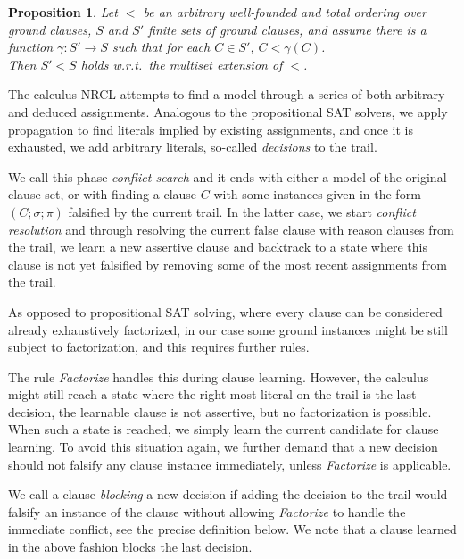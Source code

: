 \documentclass[a4paper]{article}
\newcommand{\leaveabit}{\\[6 pt]}
\newtheorem{prop}[defi]{Proposition}
\begin{document}
\begin{prop}\label{orderPropProp}
Let $<$ be \emph{an arbitrary well-founded and total ordering over ground clauses}, 
$S$ and $S'$ finite sets of ground clauses, and assume there is a function
$\gamma: S' \rightarrow S$ such that for each $C \in S'$, $C < \gamma(C)$.
\leaveabit
Then $S' < S$ holds w.r.t.\
the multiset extension of $<$.
\end{prop}

The calculus NRCL attempts to find a model through a series of both arbitrary and deduced assignments. 
Analogous to the propositional SAT solvers, we apply propagation to find literals implied by 
existing assignments, and once it is exhausted, we add arbitrary literals, so-called \emph{decisions} to the trail.

We call this phase \emph{conflict search} and it ends with either a model of the original clause set, or with finding 
a clause $C$ with some instances given in the form $(C; \sigma; \pi)$ falsified by the current trail.
In the latter case, we start \emph{conflict resolution} and through resolving the current false clause with reason clauses 
from the trail, we learn a new assertive clause and backtrack to a state where this clause is not yet falsified by removing some 
of the most recent assignments from the trail.

As opposed to propositional SAT solving, where every clause can be considered already exhaustively factorized, 
in our case some ground instances might be still subject to factorization, and this requires further rules.

The rule \emph{Factorize} handles this during clause learning.
However, the calculus might still reach a state where the right-most literal on the trail is the last decision, the learnable clause is not 
assertive, but no factorization is possible.
When such a state is reached, we simply learn the current candidate for clause learning.
To avoid this situation again, we further demand that a new decision should not falsify any clause instance immediately, unless
\emph{Factorize} is applicable.

We call a clause \emph{blocking} a new decision if adding the decision to the trail would falsify an instance of the clause without
allowing \emph{Factorize} to handle the immediate conflict, see the precise definition below. 
We note that a clause learned in the above fashion blocks the last decision.
\end{document}

